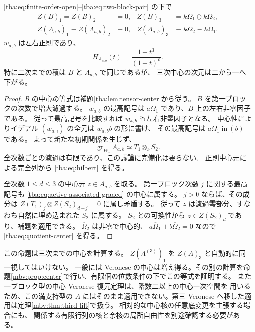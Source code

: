 \begin{proposition}[二ブロックの低次数中心と正則性]
\label{tba:prop:low-centers}
\eqref{tba:eq:finite-order-open}--\eqref{tba:eq:two-block-pair} の下で
\begin{align}
 Z(B)_1=Z(B)_2&=0,& Z(B)_3&=k\Omega_1\oplus k\Omega_2,
 \label{tba:eq:ambient-center}\\
 Z(A_{a,b})_1=Z(A_{a,b})_2&=0,&
 Z(A_{a,b})_3&=k\overline\Omega_2
              =k\overline\Omega_1.
 \label{tba:eq:quotient-center}
\end{align}
$w_{a,b}$ は左右正則であり、
\begin{equation}\label{tba:eq:hilbert}
 H_{A_{a,b}}(t)=\frac{1-t^3}{(1-t)^6}.
\end{equation}
特に二次までの積は $B$ と $A_{a,b}$ で同じであるが、
三次中心の次元は二から一へ下がる。
\end{proposition}
\begin{proof}
$B$ の中心の等式は補題\ref{tba:lem:tensor-center}から従う。
$B$ を第一ブロックの次数で増大濾過する。
$w_{a,b}$ の最高記号は $a\Omega_1$ であり、$B$ 上の左右非零因子である。
従って最高記号を比較すれば $w_{a,b}$ も左右非零因子となる。
中心性によりイデアル $(w_{a,b})$ の全元は $w_{a,b}b$ の形に書け、
その最高記号は $a\Omega_1\operatorname{in}(b)$ である。
よって新たな初期関係を生じず、
\begin{equation}\label{tba:eq:active-associated-graded}
 \operatorname{gr}_{W_1}A_{a,b}\simeq T_1\otimes_kS_2.
\end{equation}
全次数ごとの濾過は有限であり、この議論に完備化は要らない。
正則中心元による完全列から \eqref{tba:eq:hilbert} を得る。

全次数 $1\leq d\leq3$ の中心元 $z\in A_{a,b}$ を取る。
第一ブロック次数 $j$ に関する最高記号も
\eqref{tba:eq:active-associated-graded} の中心に属する。
$j>0$ ならば、その成分は
$Z(T_1)_j\otimes Z(S_2)_{d-j}=0$ に属し矛盾する。
従って $z$ は濾過零部分、すなわち自然に埋め込まれた $S_2$ に属する。
$S_2$ との可換性から $z\in Z(S_2)_d$ であり、補題を適用できる。
$\overline\Omega_2$ は非零で中心的、
$a\overline\Omega_1+b\overline\Omega_2=0$ なので
\eqref{tba:eq:quotient-center} を得る。
\end{proof}

\begin{remark}[中心計算の適用範囲]
\label{tba:rem:center-scope}
この命題は三次までの中心を計算する。
$Z(A^{(3)})_1$ を $Z(A)_3$ と自動的に同一視してはいけない。
一般には Veronese の中心は増え得る。その別の計算を命題\ref{mbv:prop:center}で行い、有限個の位数条件の下でこの等式を証明する。
また一ブロック型の中心 Veronese 復元定理は、階数二以上の中心一次空間を
用いるため、この満支持型の $A$ にはそのまま適用できない。第三 Veronese へ移した適用は定理\ref{mbv:thm:third-lift}で扱う。
相対的な中心核の任意底変更を主張する場合にも、
関係する有限行列の核と余核の局所自由性を別途確認する必要がある。
\end{remark}

